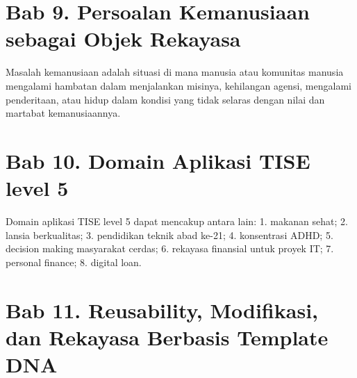 \documentclass[
  letterpaper,
  DIV=11,
  numbers=noendperiod]{scrreprt}
\begin{document}


\chapter*{Bab 9. Persoalan Kemanusiaan sebagai Objek
Rekayasa}\label{bab-9.-persoalan-kemanusiaan-sebagai-objek-rekayasa}


Masalah kemanusiaan adalah situasi di mana manusia atau komunitas
manusia mengalami hambatan dalam menjalankan misinya, kehilangan agensi,
mengalami penderitaan, atau hidup dalam kondisi yang tidak selaras
dengan nilai dan martabat kemanusiaannya.


\chapter*{Bab 10. Domain Aplikasi TISE level
5}\label{bab-10.-domain-aplikasi-tise-level-5}


Domain aplikasi TISE level 5 dapat mencakup antara lain: 1. makanan
sehat; 2. lansia berkualitas; 3. pendidikan teknik abad ke-21; 4.
konsentrasi ADHD; 5. decision making masyarakat cerdas; 6. rekayasa
finansial untuk proyek IT; 7. personal finance; 8. digital loan.


\chapter*{Bab 11. Reusability, Modifikasi, dan Rekayasa Berbasis
Template
DNA}\label{bab-11.-reusability-modifikasi-dan-rekayasa-berbasis-template-dna}

\end{document}
